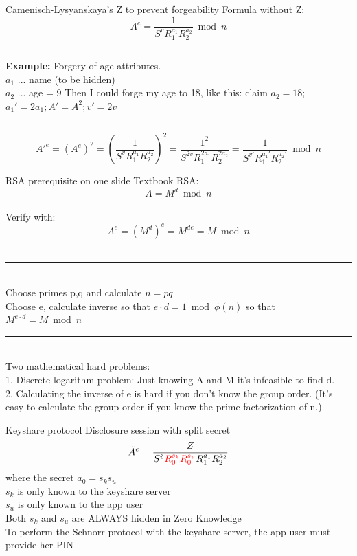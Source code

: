 \begin{frame}{Camenisch-Lysyanskaya's Z to prevent forgeability}
  Formula without Z:\\
  $$ A^e = \frac{1}{S^{v} R_1^{a_1}R_2^{a_2}} \bmod n $$
  \vspace{2em}
  \begin{columns}[onlytextwidth]
      \textbf{Example:} Forgery of age attributes.\\
      \vspace{1em}
      $a_1$ ... name (to be hidden)\\
      $a_2$ ... age = 9
      \vspace{1em}
      Then I could forge my age to 18, like this:
      claim $a_2 = 18$; \hspace{1em} $a_1' = 2a_1; A' = A^2; v'=2v$
    \end{columns}
  \vspace{1em}
      $$ A'^e = (A^e)^2 = \left(\frac{1}{S^{v} R_1^{a_1}R_2^{a_2}}\right)^2 = \frac{1^2}{S^{2v} R_1^{2a_1}R_2^{2a_2}} = \frac{1}{S^{v'} R_1^{a_1'}R_2^{a_2'}} \bmod n $$
  \note{}
\end{frame}


\begin{frame}{RSA prerequisite on one slide}
  Textbook RSA:\\
  $$A = M^d  \bmod n$$\\
  Verify with: $$A^e = (M^d)^e = M^{de} = M \bmod n$$\\
  \rule{\paperwidth}{0.4pt}\\
  Choose primes p,q and calculate $ n = pq $\\
  Choose e, calculate inverse so that $ e \cdot d = 1 \bmod \phi(n) $ so that $M^{e \cdot d} = M \bmod n$\\
  \rule{\paperwidth}{0.4pt}\\
  Two mathematical hard problems:\\
  1. Discrete logarithm problem: Just knowing A and M it's infeasible to find d.\\
  2. Calculating the inverse of e is hard if you don't know the group order. (It's easy to calculate the group order if you know the prime factorization of n.)
\end{frame}

\begin{frame}{Keyshare protocol}
  Disclosure session with split secret
  $$\displaystyle \tilde{A}^e = \frac{Z}{S^{\tilde{v}} {\color{red}R_0^{s_k} R_0^{s_u}} R_1^{a_1} R_2^{a_2}} $$
  where the secret $a_0 = s_k s_u$\\
  $s_k$ is only known to the keyshare server\\
  $s_u$ is only known to the app user\\[1em]
  Both $s_k$ and $s_u$ are ALWAYS hidden in Zero Knowledge\\
  To perform the Schnorr protocol with the keyshare server, the app user must provide her PIN
  \note{}
\end{frame}

